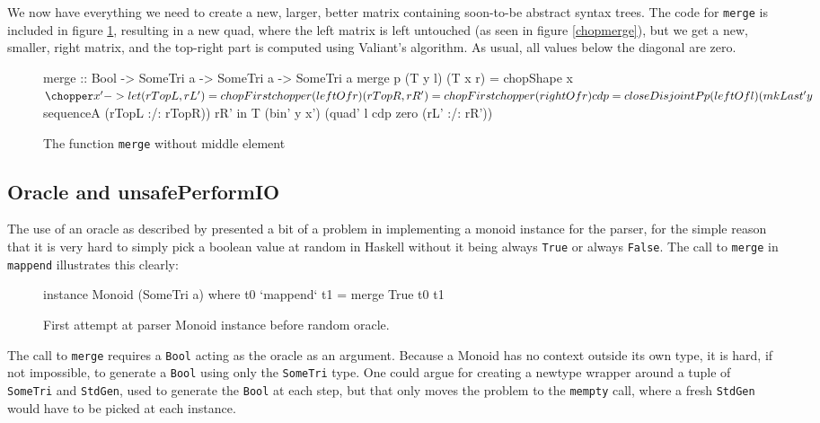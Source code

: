\documentclass[a4paper,12pt,notitlepage]{report}
\begin{document}
We now have everything we need to create a new, larger, better matrix containing
soon-to-be abstract syntax trees. The code for \texttt{merge} is included in
figure \ref{merge}, resulting in a new quad, where the left matrix is left
untouched (as seen in figure \ref{chopmerge}), but we get a new, smaller, right
matrix, and the top-right part is computed using Valiant's algorithm. As usual,
all values below the diagonal are zero.

\begin{figure}[H]
\begin{code}
merge :: Bool -> SomeTri a -> SomeTri a -> SomeTri a
merge p (T y l) (T x r) = chopShape x $ \chopper x' ->
    let (rTopL, rL') = chopFirst chopper (leftOf r)
        (rTopR, rR') = chopFirst chopper (rightOf r)
        cdp = closeDisjointP p (leftOf l) 
                (mkLast' y $ sequenceA (rTopL :/: rTopR)) rR'
    in T (bin' y x') (quad' l cdp zero (rL' :/: rR'))
\end{code}
\caption{The function \texttt{merge} without middle element}
\label{merge}
\end{figure}

\subsection{Oracle and unsafePerformIO}
\label{oraclesection}
The use of an oracle as described by \citet{parparsepaper} presented a bit
of a problem in implementing a monoid instance for the parser, for the simple
reason that it is very hard to simply pick a boolean value at random in Haskell
without it being always \texttt{True} or always \texttt{False}. The call to
\texttt{merge} in \texttt{mappend} illustrates this clearly:

\begin{figure}[H]
\begin{code}
instance Monoid (SomeTri a) where
    t0 `mappend` t1 = merge True t0 t1
\end{code}
\caption{First attempt at parser Monoid instance before random oracle.}
\end{figure}

The call to \texttt{merge} requires a \texttt{Bool} acting as the oracle as an
argument. Because a Monoid has no context outside its own type, it is hard, if not
impossible, to generate a \texttt{Bool} using only the \texttt{SomeTri} type.
One could argue for creating a newtype wrapper around a tuple of
\texttt{SomeTri} and \texttt{StdGen}, used to generate the \texttt{Bool} at each
step, but that only moves the problem to the \texttt{mempty}
call, where a fresh \texttt{StdGen} would have to be picked at each instance.
\end{document}
